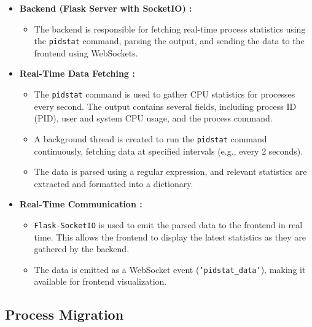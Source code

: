 \documentclass[12pt]{article}
\begin{document}
\begin{itemize}
\item {\bf Backend (Flask Server with SocketIO) :}
\begin{itemize}
    \item The backend is responsible for fetching real-time process statistics using the \texttt{pidstat} command, parsing the output, and sending the data to the frontend using WebSockets.
\end{itemize}

\item{\bf Real-Time Data Fetching :}
\begin{itemize}
    \item The \texttt{pidstat} command is used to gather CPU statistics for processes every second. The output contains several fields, including process ID (PID), user and system CPU usage, and the process command.
    \item A background thread is created to run the \texttt{pidstat} command continuously, fetching data at specified intervals (e.g., every 2 seconds).
    \item The data is parsed using a regular expression, and relevant statistics are extracted and formatted into a dictionary.
\end{itemize}

\item{\bf Real-Time Communication :}
\begin{itemize}
    \item \texttt{Flask-SocketIO} is used to emit the parsed data to the frontend in real time. This allows the frontend to display the latest statistics as they are gathered by the backend.
    \item The data is emitted as a WebSocket event (\texttt{'pidstat\_data'}), making it available for frontend visualization.
\end{itemize}
\end{itemize}
\subsection{Process Migration}
\end{document}
